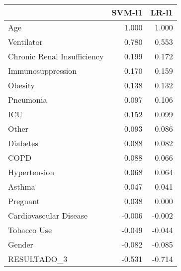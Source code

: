 \begin{tabular}{lrr}
\toprule
{} &  SVM-l1 &  LR-l1 \\
\midrule
Age                         &   1.000 &  1.000 \\
Ventilator                  &   0.780 &  0.553 \\
Chronic Renal Insufficiency &   0.199 &  0.172 \\
Immunosuppression           &   0.170 &  0.159 \\
Obesity                     &   0.138 &  0.132 \\
Pneumonia                   &   0.097 &  0.106 \\
ICU                         &   0.152 &  0.099 \\
Other                       &   0.093 &  0.086 \\
Diabetes                    &   0.088 &  0.082 \\
COPD                        &   0.088 &  0.066 \\
Hypertension                &   0.068 &  0.064 \\
Asthma                      &   0.047 &  0.041 \\
Pregnant                    &   0.038 &  0.000 \\
Cardiovascular Disease      &  -0.006 & -0.002 \\
Tobacco Use                 &  -0.049 & -0.044 \\
Gender                      &  -0.082 & -0.085 \\
RESULTADO\_3                 &  -0.531 & -0.714 \\
\bottomrule
\end{tabular}
